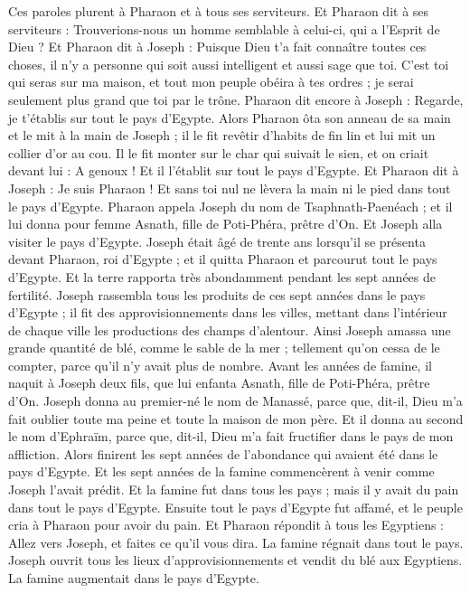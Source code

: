 \begin{multicols}{2}
Ces paroles plurent à Pharaon et à tous ses serviteurs.
Et Pharaon dit à ses serviteurs : Trouverions-nous un homme semblable à celui-ci, qui a l'Esprit de Dieu ?
Et Pharaon dit à Joseph : Puisque Dieu t'a fait connaître toutes ces choses, il n'y a personne qui soit aussi intelligent et aussi sage que toi.
C’est toi qui seras sur ma maison, et tout mon peuple obéira à tes ordres ; je serai seulement plus grand que toi par le trône.
Pharaon dit encore à Joseph : Regarde, je t’établis sur tout le pays d'Egypte.
Alors Pharaon ôta son anneau de sa main et le mit à la main de Joseph ; il le fit revêtir d'habits de fin lin et lui mit un collier d'or au cou.
Il le fit monter sur le char qui suivait le sien, et on criait devant lui : A genoux ! Et il l'établit sur tout le pays d'Egypte.
Et Pharaon dit à Joseph : Je suis Pharaon ! Et sans toi nul ne lèvera la main ni le pied dans tout le pays d'Egypte.
Pharaon appela Joseph du nom de Tsaphnath-Paenéach ; et il lui donna pour femme Asnath, fille de Poti-Phéra, prêtre d'On. Et Joseph alla visiter le pays d'Egypte.
Joseph était âgé de trente ans lorsqu’il se présenta devant Pharaon, roi d'Egypte ; et il quitta Pharaon et parcourut tout le pays d'Egypte.
Et la terre rapporta très abondamment pendant les sept années de fertilité.
Joseph rassembla tous les produits de ces sept années dans le pays d’Egypte ; il fit des approvisionnements dans les villes, mettant dans l’intérieur de chaque ville les productions des champs d’alentour.
Ainsi Joseph amassa une grande quantité de blé, comme le sable de la mer ; tellement qu'on cessa de le compter, parce qu’il n’y avait plus de nombre.
Avant les années de famine, il naquit à Joseph deux fils, que lui enfanta Asnath, fille de Poti-Phéra, prêtre  d'On.
Joseph donna au premier-né le nom de Manassé, parce que, dit-il, Dieu m'a fait oublier toute ma peine et toute la maison de mon père.
Et il donna au second le nom d’Ephraïm, parce que, dit-il, Dieu m'a fait fructifier dans le  pays de mon affliction.
Alors finirent les sept années de l'abondance qui avaient été dans le pays d'Egypte.
Et les sept années de la famine commencèrent à venir comme Joseph l'avait prédit. Et la famine fut dans tous les pays ; mais il y avait du pain dans tout le pays d'Egypte.
Ensuite tout le pays d'Egypte fut affamé, et le peuple cria à Pharaon pour avoir du pain. Et Pharaon répondit à tous les Egyptiens : Allez vers Joseph, et faites ce qu'il vous dira.
La famine régnait dans tout le pays. Joseph ouvrit tous les lieux d’approvisionnements et vendit du blé aux Egyptiens. La famine augmentait dans le pays d’Egypte.

\end{multicols}

